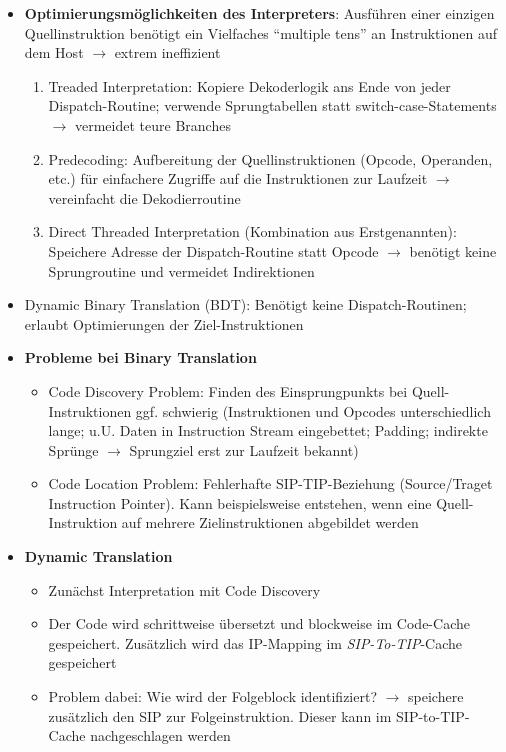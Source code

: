 \begin{itemize}
	\item \textbf{Optimierungsmöglichkeiten des Interpreters}: Ausführen einer einzigen Quellinstruktion benötigt ein Vielfaches "`multiple tens"' an Instruktionen auf dem Host \(\rightarrow\) extrem ineffizient
	\begin{enumerate} %
		\item Treaded Interpretation: Kopiere Dekoderlogik ans Ende von jeder Dispatch-Routine; verwende Sprungtabellen statt switch-case-Statements \(\rightarrow\) vermeidet teure Branches
		\item Predecoding: Aufbereitung der Quellinstruktionen (Opcode, Operanden, etc.) für einfachere Zugriffe auf die Instruktionen zur Laufzeit \(\rightarrow\) vereinfacht die Dekodierroutine
		\item Direct Threaded Interpretation (Kombination aus Erstgenannten): Speichere Adresse der Dispatch-Routine statt Opcode \(\rightarrow\) benötigt keine Sprungroutine und vermeidet Indirektionen 
	\end{enumerate}
	\item Dynamic Binary Translation (BDT): Benötigt keine Dispatch-Routinen; erlaubt Optimierungen der Ziel-Instruktionen
	\item \textbf{Probleme bei Binary Translation}
	\begin{itemize}
		\item Code Discovery Problem: Finden des Einsprungpunkts bei Quell-Instruktionen ggf. schwierig (Instruktionen und Opcodes unterschiedlich lange; u.U. Daten in Instruction Stream eingebettet; Padding; indirekte Sprünge \(\rightarrow\) Sprungziel erst zur Laufzeit bekannt)
		\item Code Location Problem: Fehlerhafte SIP-TIP-Beziehung (Source/Traget Instruction Pointer). Kann beispielsweise entstehen, wenn eine Quell-Instruktion auf mehrere Zielinstruktionen abgebildet werden
	\end{itemize}
	\item \textbf{Dynamic Translation}
	\begin{itemize}
		\item Zunächst Interpretation mit Code Discovery
		\item Der Code wird schrittweise übersetzt und blockweise im Code-Cache gespeichert. Zusätzlich wird das IP-Mapping im \textit{SIP-To-TIP}-Cache gespeichert
		\item Problem dabei: Wie wird der Folgeblock identifiziert? \(\rightarrow\) speichere zusätzlich den SIP zur Folgeinstruktion. Dieser kann im SIP-to-TIP-Cache nachgeschlagen werden

\end{itemize}
\end{itemize}
